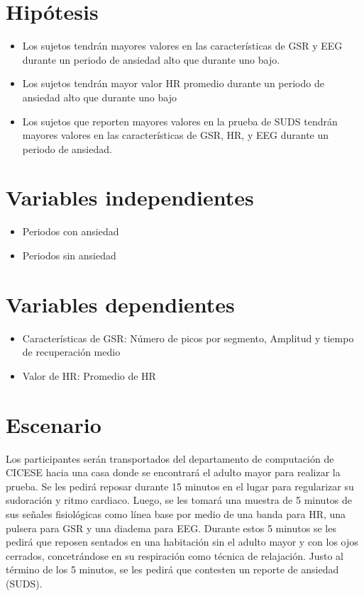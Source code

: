 \section{Hip\'otesis}
	\begin{itemize}
	\item{Los sujetos tendr\'an mayores valores en las caracter\'isticas de GSR y EEG durante un periodo de ansiedad alto que durante uno bajo.}
	\item{Los sujetos tendr\'an mayor valor HR promedio durante un periodo de ansiedad alto que durante uno bajo}
	\item{Los sujetos que reporten mayores valores en la prueba de SUDS tendr\'an mayores valores en las caracter\'isticas de GSR, HR, y EEG durante un periodo de ansiedad.}
	\end{itemize}
\section{Variables independientes}
	\begin{itemize}
		\item{Periodos con ansiedad}
		\item{Periodos sin ansiedad}
	\end{itemize}
\section{Variables dependientes}
	\begin{itemize}
		\item{Caracter\'isticas de GSR: N\'umero de picos por segmento, Amplitud y tiempo de recuperaci\'on medio}
		\item{Valor de HR: Promedio de HR}
	\end{itemize}
\section{Escenario}
	Los participantes ser\'an transportados del departamento de computaci\'on de CICESE hacia una casa donde se encontrar\'a el adulto mayor
	para realizar la prueba.
	Se les pedir\'a reposar durante 15 minutos en el lugar para regularizar su sudoraci\'on y ritmo cardiaco.
	Luego, se les tomar\'a una muestra de 5 minutos de sus se\~nales fisiol\'ogicas como l\'inea base por medio de una banda para HR, una pulsera para GSR y una diadema para EEG. Durante estos 5 minutos
	se les pedir\'a  que reposen sentados en una habitaci\'on sin el adulto mayor y con los ojos cerrados, concetr\'andose en
	su respiraci\'on como t\'ecnica de relajaci\'on. Justo al t\'ermino de los 5 minutos, se les pedir\'a que contesten un reporte de ansiedad
	(SUDS).

